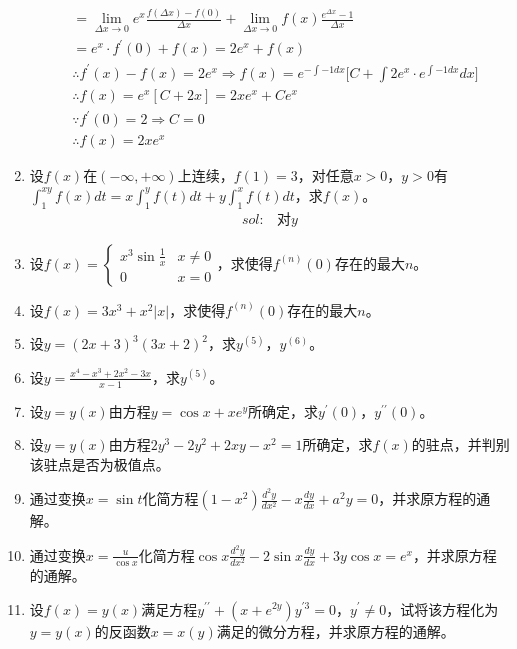 \begin{enumerate}[{例}1.]
\begin{align*}
                &=\lim_{\Delta x\to 0}e^x\frac{f(\Delta x)-f(0)}{\Delta x}+\lim_{\Delta x\to 0}f(x)\frac{e^{\Delta x}-1}{\Delta x}\\
                &=e^x\cdot f^{\prime}(0)+f(x)=2e^x+f(x)\\
                &\therefore f^{\prime}(x)-f(x)=2e^x\Rightarrow f(x)=e^{-\int -1dx}\Big[C+\int2e^x\cdot e^{\int -1dx}dx\Big]\\
                &\therefore f(x)=e^x[C+2x]=2xe^x+Ce^x\\
                &\because f^{\prime}(0)=2\Rightarrow C=0\\
                &\therefore f(x)=2xe^x
        \end{align*}
    \item 设$f(x)$在$(-\infty,+\infty)$上连续，$f(1)=3$，对任意$x>0$，$y>0$有$\int_1^{xy}f(x)dt=x\int_1^y f(t)dt+y\int_1^x f(t)dt$，求$f(x)$。
        \begin{align*}
            sol:&\mbox{对}y\mbox{}
        \end{align*}
    \item 设$f(x)=\begin{cases}x^3 \sin \frac{1}{x} & x\neq 0\\
                                0 & x=0
                \end{cases}$，求使得$f^{(n)}(0)$存在的最大$n$。
    \item 设$f(x)=3x^3 + x^2 \left|x\right|$，求使得$f^{(n)}(0)$存在的最大$n$。
    \item 设$y=(2x+3)^3(3x+2)^2$，求$y^{(5)}$，$y^{(6)}$。
    \item 设$y=\frac{x^4-x^3+2x^2-3x}{x-1}$，求$y^{(5)}$。
    \item 设$y=y(x)$由方程$y=\cos x +xe^y$所确定，求$y^{\prime}(0)$，$y^{\prime\prime}(0)$。
    \item 设$y=y(x)$由方程$2y^3-2y^2+2xy-x^2 =1$所确定，求$f(x)$的驻点，并判别该驻点是否为极值点。
    \item 通过变换$x=\sin t$化简方程$(1-x^2)\frac{d^2y}{dx^2}-x\frac{dy}{dx}+a^2 y=0$，并求原方程的通解。
    \item 通过变换$x=\frac{u}{\cos x}$化简方程$\cos x \frac{d^2 y}{d x^2}-2\sin x \frac{dy}{dx}+3y \cos x=e^x$，并求原方程的通解。
    \item 设$f(x)=y(x)$满足方程$y^{\prime\prime}+(x+e^{2y})y^{\prime 3}=0$，$y^{\prime}\neq 0$，试将该方程化为$y=y(x)$的反函数$x=x(y)$满足的微分方程，并求原方程的通解。
\end{enumerate}
